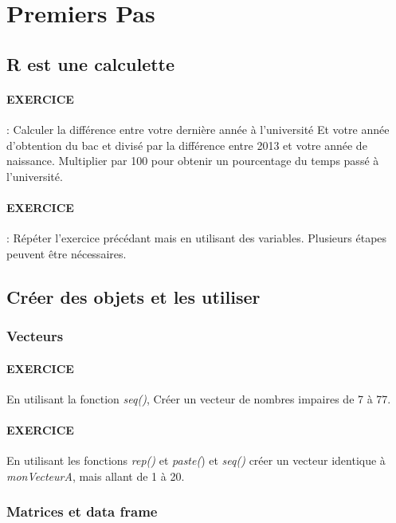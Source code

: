 \section{Premiers Pas}
\subsection{R est une calculette}


\paragraph{EXERCICE} : 
 Calculer la différence entre votre dernière année à l'université
 Et votre année d'obtention du bac et divisé par la différence entre 2013 et votre
 année de naissance. Multiplier par 100 pour obtenir un pourcentage du temps passé 
 à l'université.

\paragraph{EXERCICE} : 
Répéter l'exercice précédant mais en utilisant des variables. Plusieurs étapes peuvent être nécessaires.
\subsection{Créer des objets et les utiliser}
\subsubsection{Vecteurs}

\paragraph{EXERCICE} En utilisant la fonction \emph{seq()}, Créer un vecteur de nombres impaires de 7 à 77. 

\paragraph{EXERCICE} En utilisant les fonctions \emph{rep()} et \emph{paste(}) et \emph{seq()} créer un vecteur identique à \emph{monVecteurA}, mais allant de 1 à 20.

\subsubsection{Matrices et data frame}

